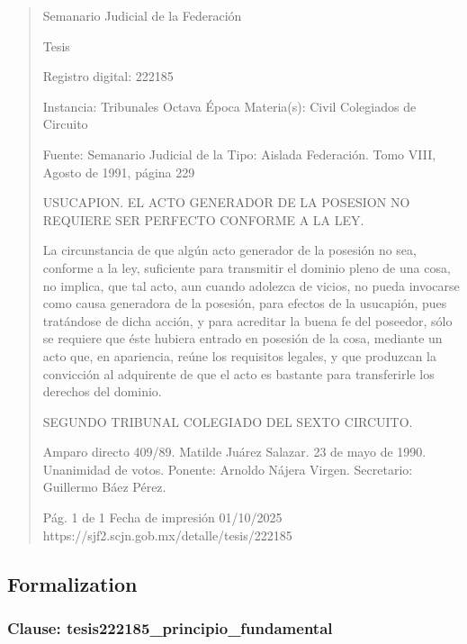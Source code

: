 \documentclass[11pt,a4paper]{article}
\begin{document}
\begin{quote}
                                                   Semanario Judicial de la Federación

                                                  Tesis

 Registro digital: 222185

 Instancia: Tribunales            Octava Época                        Materia(s): Civil
 Colegiados de Circuito

                                  Fuente: Semanario Judicial de la    Tipo: Aislada
                                  Federación.
                                  Tomo VIII, Agosto de 1991, página
                                  229


USUCAPION. EL ACTO GENERADOR DE LA POSESION NO REQUIERE SER PERFECTO
CONFORME A LA LEY.


La circunstancia de que algún acto generador de la posesión no sea, conforme a la ley, suficiente
para transmitir el dominio pleno de una cosa, no implica, que tal acto, aun cuando adolezca de
vicios, no pueda invocarse como causa generadora de la posesión, para efectos de la usucapión,
pues tratándose de dicha acción, y para acreditar la buena fe del poseedor, sólo se requiere que
éste hubiera entrado en posesión de la cosa, mediante un acto que, en apariencia, reúne los
requisitos legales, y que produzcan la convicción al adquirente de que el acto es bastante para
transferirle los derechos del dominio.

SEGUNDO TRIBUNAL COLEGIADO DEL SEXTO CIRCUITO.


Amparo directo 409/89. Matilde Juárez Salazar. 23 de mayo de 1990. Unanimidad de votos.
Ponente: Arnoldo Nájera Virgen. Secretario: Guillermo Báez Pérez.




                                             Pág. 1 de 1          Fecha de impresión 01/10/2025
  https://sjf2.scjn.gob.mx/detalle/tesis/222185

\end{quote}

\subsection{Formalization}

\subsubsection{Clause: tesis222185\_principio\_fundamental}
\end{document}
